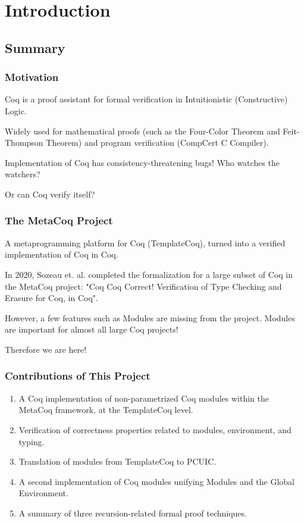 \section{Introduction}
\subsection{Summary}

\begin{frame}
  \frametitle{Motivation}
  Coq is a proof assistant for formal verification in Intuitionistic
  (Constructive) Logic.\pause
  
  Widely used for mathematical proofs (such as the Four-Color Theorem and
  Feit-Thompson Theorem) and program verification (CompCert C Compiler).
  \pause

  Implementation of Coq has consistency-threatening bugs! Who watches the
  watchers?\pause

  Or can Coq verify itself?
\end{frame}

\begin{frame}
  \frametitle{The MetaCoq Project}
  A metaprogramming platform for Coq (TemplateCoq), turned into a verified
  implementation of Coq in Coq.\pause
  
  In 2020, Sozeau et. al. completed the formalization for a large subset of Coq
  in the MetaCoq project: "Coq Coq Correct! Verification of Type Checking and
  Erasure for Coq, in Coq".\pause

  However, a few features such as Modules are missing from the project. Modules
  are important for almost all large Coq projects!\pause

  Therefore we are here!
\end{frame}

\begin{frame}
  \frametitle{Contributions of This Project}
  \begin{enumerate}
    \item A Coq implementation of non-parametrized Coq modules within the
    MetaCoq framework, at the TemplateCoq level.\pause
    \item Verification of correctness properties related to modules,
    environment, and typing.\pause
    \item Translation of modules from TemplateCoq to PCUIC.\pause
    \item A second implementation of Coq modules unifying Modules and the Global
    Environment.\pause
    \item A summary of three recursion-related formal proof techniques.\pause
  \end{enumerate}
\end{frame}